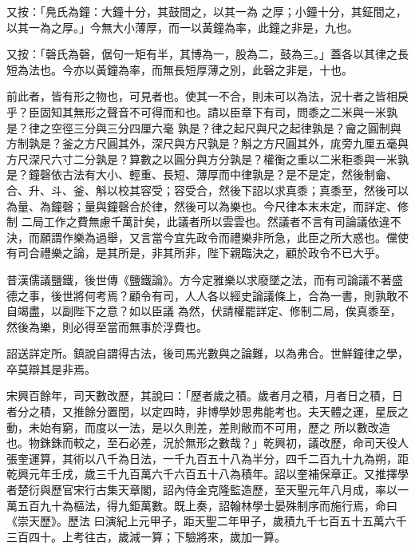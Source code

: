 \begin{pinyinscope}
 又按：「鳧氏為鐘：大鐘十分，其鼓間之，以其一為
 之厚；小鐘十分，其鉦間之，以其一為之厚。」今無大小薄厚，而一以黃鐘為率，此鐘之非是，九也。



 又按：「磬氏為磬，倨句一矩有半，其博為一，股為二，鼓為三。」蓋各以其律之長短為法也。今亦以黃鐘為率，而無長短厚薄之別，此磬之非是，十也。



 前此者，皆有形之物也，可見者也。使其一不合，則未可以為法，況十者之皆相戾乎？臣固知其無形之聲音不可得而和也。請以臣章下有司，問黍之二米與一米孰是？律之空徑三分與三分四厘六毫
 孰是？律之起尺與尺之起律孰是？龠之圓制與方制孰是？釜之方尺圓其外，深尺與方尺孰是？斛之方尺圓其外，庣旁九厘五毫與方尺深尺六寸二分孰是？算數之以圓分與方分孰是？權衡之重以二米秬黍與一米孰是？鐘磬依古法有大小、輕重、長短、薄厚而中律孰是？是不是定，然後制龠、合、升、斗、釜、斛以校其容受；容受合，然後下詔以求真黍；真黍至，然後可以為量、為鐘磬；量與鐘磬合於律，然後可以為樂也。今尺律本末未定，而詳定、修制
 二局工作之費無慮千萬計矣，此議者所以雲雲也。然議者不言有司論議依違不決，而願謂作樂為過舉，又言當今宜先政令而禮樂非所急，此臣之所大惑也。儻使有司合禮樂之論，是其所是，非其所非，陛下親臨決之，顧於政令不已大乎。



 昔漢儒議鹽鐵，後世傳《鹽鐵論》。方今定雅樂以求廢墜之法，而有司論議不著盛德之事，後世將何考焉？顧令有司，人人各以經史論議條上，合為一書，則孰敢不自竭盡，以副陛下之意？如以臣議
 為然，伏請權罷詳定、修制二局，俟真黍至，然後為樂，則必得至當而無事於浮費也。



 詔送詳定所。鎮說自謂得古法，後司馬光數與之論難，以為弗合。世鮮鐘律之學，卒莫辯其是非焉。



 宋興百餘年，司天數改歷，其說曰：「歷者歲之積。歲者月之積，月者日之積，日者分之積，又推餘分置閏，以定四時，非博學妙思弗能考也。夫天體之運，星辰之動，未始有窮，而度以一法，是以久則差，差則敝而不可用，歷之
 所以數改造也。物銖銖而較之，至石必差，況於無形之數哉？」乾興初，議改歷，命司天役人張奎運算，其術以八千為日法，一千九百五十八為半分，四千二百九十九為朔，距乾興元年壬戌，歲三千九百萬六千六百五十八為積年。詔以奎補保章正。又推擇學者楚衍與歷官宋行古集天章閣，詔內侍金克隆監造歷，至天聖元年八月成，率以一萬五百九十為樞法，得九鉅萬數。既上奏，詔翰林學士晏殊制序而施行焉，命曰《崇天歷》。歷法
 曰演紀上元甲子，距天聖二年甲子，歲積九千七百五十五萬六千三百四十。上考往古，歲減一算；下驗將來，歲加一算。




\end{pinyinscope}
